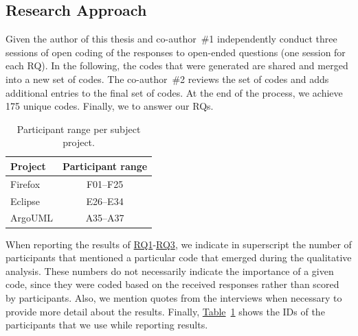 \subsection{Research Approach}

Given the \DIFdelbegin {}%
\DIFdelend \DIFaddbegin {}\DIFaddend author of
this thesis and co-author~\#1 independently conduct three sessions of open
coding of the responses to open-ended questions (one session for each RQ). In
the following, the codes that were generated are shared and merged into a new
set of codes. The co-author~\#2 reviews the set of codes and adds additional
entries to the final set of codes. At the end of the process, we achieve 175
unique codes. Finally, we \DIFdelbegin {}\DIFdelend \DIFaddbegin {} \DIFaddend to answer our RQs. \DIFaddbegin {}
\DIFaddend 

\begin{table}
	\footnotesize
	\centering
	\caption{Participant range per subject project.
		\label{tbl:participants}
	}
	\begin{tabular}{lc}
		\hline 
		\textbf{Project} & \textbf{Participant range}\tabularnewline
		\hline 
		\hline 
		Firefox & F01--F25\tabularnewline
		\hline 
		Eclipse & E26--E34\tabularnewline
		\hline 
		ArgoUML & A35--A37\tabularnewline
		\hline 
	\end{tabular}
\end{table}

When reporting the results of \hyperref[ch5:rq1]{RQ1}-\hyperref[ch5:rq3]{RQ3},
we indicate in superscript the number of participants that mentioned a
particular code that emerged during the qualitative analysis. These numbers do
not necessarily indicate the importance of a given code, since they were coded
based on the received responses rather than scored by \DIFaddbegin {}\DIFaddend participants. Also, we
mention quotes from the interviews when necessary to provide more detail about
the results\DIFdelbegin {}\DIFdelend . Finally, \hyperref[tbl:participants]{Table}~\ref{tbl:participants}
shows the IDs of the participants that we use while reporting results.

